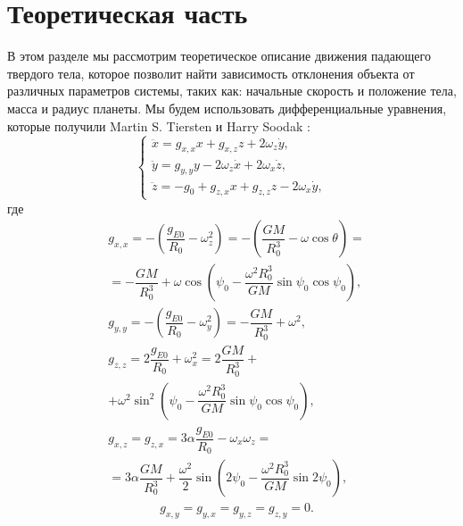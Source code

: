 \documentclass[hoptionsi, twocolumn]{revtex4-2}
\begin{document}
\section{Теоретическая часть}
В этом разделе мы рассмотрим теоретическое описание движения падающего твердого тела, которое позволит найти зависимость отклонения объекта от различных параметров системы, таких как: начальные скорость и положение тела, масса и радиус планеты. Мы будем использовать дифференциальные уравнения, которые получили Martin S. Tiersten и Harry Soodak \cite{4}:
\begin{equation*}
    \begin{cases}
    \ddot{x} = g_{x, x}x +g_{x,z}z+2\omega_{z}\dot{y}, \\
    \ddot{y} = g_{y, y}y -2\omega_{z}\dot{x} +2\omega_{x}\dot{z}, \\
     \ddot{z} = - g_0+ g_{z, x}x + g_{z, z}z-2\omega_{x}\dot{y}, 
    \end{cases}
\end{equation*}
где
\begin{equation*}
    \begin{aligned}
        &g_{x,x}=-\left(\dfrac{g_{E0}}{R_0}-\omega_z^2\right)=-\left(\dfrac{GM}{R^3_0}-\omega\cos{\theta}\right) =\\
        &= -\dfrac{GM}{R^3_0} +\omega\cos{\left(\psi_0-\dfrac{\omega^2R_0^3}{GM}\sin{\psi_0}\cos{\psi_0}\right)}, \\
        &g_{y,y}=-\left(\dfrac{g_{E0}}{R_0}-\omega_y^2\right)=-\dfrac{GM}{R_0^3}+\omega^2,\\
        &g_{z,z}=2\dfrac{g_{E0}}{R_0}+\omega_x^2=2\dfrac{GM}{R_0^3}+\\
        &+\omega^2\sin^2{\left(\psi_0-\dfrac{\omega^2R_0^3}{GM}\sin{\psi_0}\cos{\psi_0}\right)},\\
          &g_{x,z}=g_{z,x}=3\alpha\dfrac{g_{E0}}{R_0} - \omega_x\omega_z=\\
&=3\alpha\dfrac{GM}{R_0^3}+\dfrac{\omega^2}{2}\sin{\left(2\psi_0-\dfrac{\omega^2R_0^3}{GM}\sin{2\psi_0}\right)},
    \end{aligned}
\end{equation*}
 \begin{equation*}
    \begin{aligned}
&g_{x,y}=g_{y,x}=g_{y,z}=g_{z,y}=0.
    \end{aligned}
\end{equation*}
\end{document}
